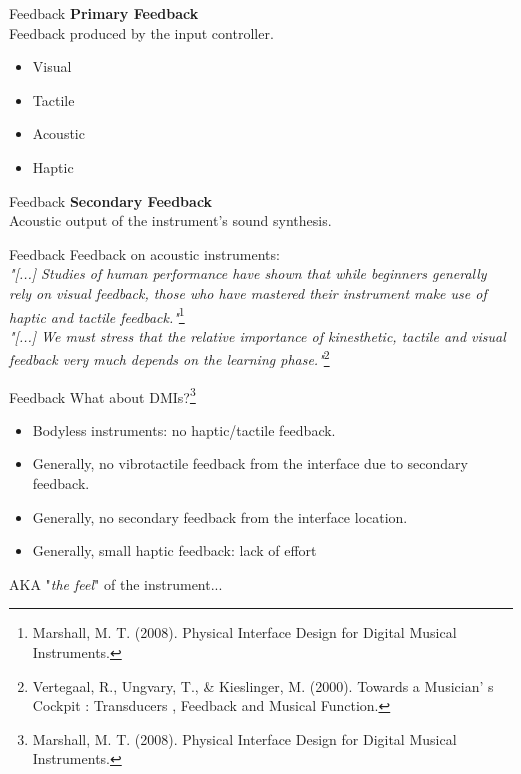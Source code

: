 \documentclass{beamer}
\begin{document}
\begin{frame}{Feedback}
    \textbf{Primary Feedback}\\
    \vspace{5mm}
    Feedback produced by the input controller.
    \begin{itemize}
        \item Visual
        \item Tactile
        \item Acoustic
        \item Haptic
    \end{itemize}
\end{frame}

\begin{frame}{Feedback}
    \textbf{Secondary Feedback}\\
    \vspace{5mm}
    Acoustic output of the instrument's sound synthesis.
\end{frame}


\begin{frame}{Feedback}
    Feedback on acoustic instruments:\\
    \vspace{5mm}
    \textit{"[...] Studies of human performance have shown that while beginners generally rely on visual feedback, those who have mastered their instrument make use of haptic and tactile feedback."}\footnote{Marshall, M. T. (2008). Physical Interface Design for Digital Musical Instruments.}\\
    \vspace{5mm}
    \textit{"[...] We must stress that the relative importance of kinesthetic, tactile and visual feedback very much depends on the learning phase."}\footnote{Vertegaal, R., Ungvary, T., \& Kieslinger, M. (2000). Towards a Musician' s Cockpit : Transducers , Feedback and Musical Function.}
    
\end{frame}

\begin{frame}{Feedback}
    What about DMIs?\footnote{Marshall, M. T. (2008). Physical Interface Design for Digital Musical Instruments.}\\
    \begin{itemize}
        \item Bodyless instruments: no haptic/tactile feedback.
        \item Generally, no vibrotactile feedback from the interface due to secondary feedback.
        \item Generally, no secondary feedback from the interface location.
        \item Generally, small haptic feedback: lack of effort
    \end{itemize}
    AKA "\textit{the feel}" of the instrument...
\end{frame}
\end{document}

